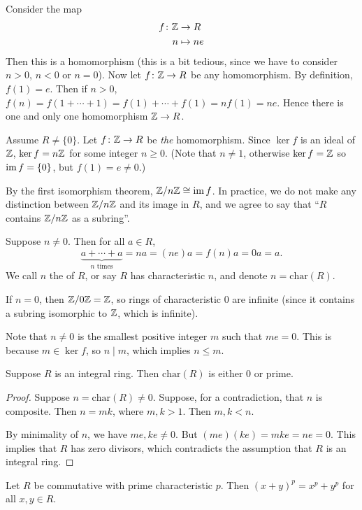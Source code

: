 Consider the map
\begin{align*}
f\colon\mathbb Z&\to R\\
n&\mapsto ne
\end{align*}
Then this is a homomorphism (this is a bit tedious, since we have to consider $n>0$, $n<0$ or $n=0$).
Now let $f\colon\mathbb Z\to R$ be any homomorphism. By definition, $f(1)=e$. Then if $n>0$, $f(n)=f(1+\cdots+1)=f(1)+\cdots+f(1)=nf(1)=ne$. Hence there is one and only one homomorphism $\mathbb Z\to R$.

Assume $R\neq\{0\}$. Let $f\colon\mathbb Z\to R$ be \emph{the} homomorphism. Since $\ker f$ is an ideal of $\mathbb Z$, $\ker f=n\mathbb Z$ for some integer $n\ge 0$. (Note that $n\neq 1$, otherwise $\ker f=\mathbb Z$ so $\operatorname{im} f=\{0\}$, but $f(1)=e\neq 0$.) 

By the first isomorphism theorem, $\mathbb Z/n\mathbb Z\cong\operatorname{im} f$. In practice, we do not make any distinction between $\mathbb Z/n\mathbb Z$ and its image in $R$, and we agree to say that ``$R$ contains $\mathbb Z/n\mathbb Z$ as a subring''. 

Suppose $n\neq0$. Then for all $a\in R$,
\[\underbrace{a+\cdots+a}_\text{$n$ times}=na=(ne)a=f(n)a=0a=a.\]
We call $n$ the  of $R$, or say $R$ has characteristic $n$, and denote $n=\mathrm{char}(R)$.

\begin{remark}
If $n=0$, then $\mathbb Z/0\mathbb Z=\mathbb Z$, so rings of characteristic $0$ are infinite (since it contains a subring isomorphic to $\mathbb Z$, which is infinite).
\end{remark}

Note that $n\neq0$ is the smallest positive integer $m$ such that $me=0$. This is because $m\in\ker f$, so $n\mid m$, which implies $n\le m$.

\begin{lemma}
Suppose $R$ is an integral ring. Then $\mathrm{char}(R)$ is either $0$ or prime.
\end{lemma}

\begin{proof}
Suppose $n=\mathrm{char}(R)\neq0$. Suppose, for a contradiction, that $n$ is composite. Then $n=mk$, where $m,k>1$. Then $m,k<n$. 

By minimality of $n$, we have $me,ke\neq 0$. But $(me)(ke)=mke=ne=0$. This implies that $R$ has zero divisors, which contradicts the assumption that $R$ is an integral ring.
\end{proof}

\begin{lemma}
Let $R$ be commutative with prime characteristic $p$. Then $(x+y)^p=x^p+y^p$ for all $x,y\in R$.
\end{lemma}

